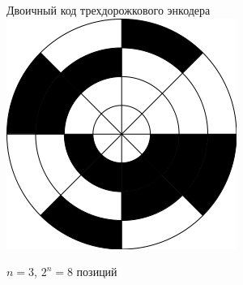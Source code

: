 \begin{frame}{Двоичный код трехдорожкового энкодера}
    \centering
    \includegraphics[width=.5\linewidth]{../Figures/3contacts.png}

    $n = 3$, $2^n = 8$ позиций
\end{frame}

